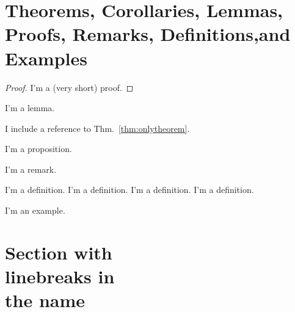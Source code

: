 \section[Theorems, Corollaries, Lemmas, Proofs, Remarks, Definitions and Examples]{Theorems, Corollaries, Lemmas, Proofs, Remarks, Definitions,and Examples}\label{sec:theorems-corollaries-lemmas-proofs-remarks-definitionsand-examples}

\begin{theorem}
    \label{thm:onlytheorem}
    \blindtext
\end{theorem}

\begin{proof}
    I'm a (very short) proof.
\end{proof}

\begin{lemma}
    I'm a lemma.
\end{lemma}

\begin{corollary}
    I include a reference to Thm.~\ref{thm:onlytheorem}.
\end{corollary}

\begin{proposition}
    I'm a proposition.
\end{proposition}

\begin{remark}
    I'm a remark.
\end{remark}

\begin{definition}
    I'm a definition.
    I'm a definition.
    I'm a definition.
    I'm a definition.
\end{definition}

\begin{example}
    I'm an example.
\end{example}


\section[Optional table of contents heading]{Section with\\ linebreaks in\\the
name}\label{sec:section-with-linebreaks-inthe
name}


\Blindtext[2]




